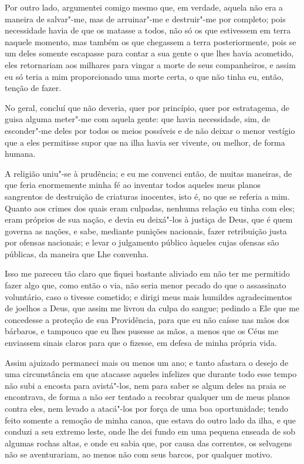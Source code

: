 Por outro lado, argumentei comigo mesmo que, em verdade, aquela não era
a maneira de salvar"-me, mas de arruinar"-me e destruir"-me por completo;
pois necessidade havia de que os matasse a todos, não só os que
estivessem em terra naquele momento, mas também os que chegassem a terra
posteriormente, pois se um deles somente escapasse para contar a sua
gente o que lhes havia acometido, eles retornariam aos milhares para
vingar a morte de seus companheiros, e assim eu só teria a mim
proporcionado uma morte certa, o que não tinha eu, então, tenção de
fazer.

No geral, concluí que não deveria, quer por princípio, quer por
estratagema, de guisa alguma meter"-me com aquela gente: que havia
necessidade, sim, de esconder"-me deles por todos os meios possíveis e de
não deixar o menor vestígio que a eles permitisse supor que na ilha
havia ser vivente, ou melhor, de forma humana.

A religião uniu"-se à prudência; e eu me convenci então, de muitas
maneiras, de que feria enormemente minha fé ao inventar todos aqueles
meus planos sangrentos de destruição de criaturas inocentes, isto é, no
que se referia a mim. Quanto aos crimes dos quais eram culpadas, nenhuma
relação eu tinha com eles; eram próprios de sua nação, e devia eu
deixá"-los à justiça de Deus, que é quem governa as nações, e sabe,
mediante punições nacionais, fazer retribuição justa por ofensas
nacionais; e levar o julgamento público àqueles cujas ofensas são
públicas, da maneira que Lhe convenha.

Isso me pareceu tão claro que fiquei bastante aliviado em não ter me
permitido fazer algo que, como então o via, não seria menor pecado do
que o assassinato voluntário, caso o tivesse cometido; e dirigi meus
mais humildes agradecimentos de joelhos a Deus, que assim me livrou da
culpa do sangue; pedindo a Ele que me concedesse a proteção de sua
Providência, para que eu não caísse nas mãos dos bárbaros, e tampouco
que eu lhes pusesse as mãos, a menos que os Céus me enviassem sinais
claros para que o fizesse, em defesa de minha própria vida.

Assim ajuizado permaneci mais ou menos um ano; e tanto afastara o desejo
de uma circunstância em que atacasse aqueles infelizes que durante todo
esse tempo não subi a encosta para avistá"-los, nem para saber se algum
deles na praia se encontrava, de forma a não ser tentado a recobrar
qualquer um de meus planos contra eles, nem levado a atacá"-los por força
de uma boa oportunidade; tendo feito somente a remoção de minha canoa,
que estava do outro lado da ilha, e que conduzi a seu extremo leste,
onde lhe dei fundo em uma pequena enseada de sob algumas rochas altas, e
onde eu sabia que, por causa das correntes, os selvagens não se
aventurariam, ao menos não com seus barcos, por qualquer motivo.

